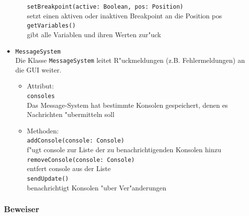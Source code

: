 \documentclass[10pt,a4paper,titlepage]{article}
\begin{document}
\begin{itemize}
\begin{itemize}
\texttt{setBreakpoint(active: Boolean, pos: Position)} \\
setzt einen aktiven oder inaktiven Breakpoint an die Position pos \\
\texttt{getVariables()} \\
gibt alle Variablen und ihren Werten zur"uck
\end{itemize}
\item \texttt{MessageSystem} \\
Die Klasse \texttt{MessageSystem} leitet R"uckmeldungen (z.B. Fehlermeldungen) an die GUI weiter. 
\begin{itemize}
\item Attribut: \\
\texttt{consoles} \\
Das Message-System hat bestimmte Konsolen gespeichert, denen es Nachrichten "ubermitteln soll 
\item Methoden: \\
\texttt{addConsole(console: Console)} \\
f"ugt console zur Liste der zu benachrichtigenden Konsolen hinzu \\
\texttt{removeConsole(console: Console)} \\
entfert console aus der Liste \\
\texttt{sendUpdate()} \\
benachrichtigt Konsolen "uber Ver"anderungen \\
\end{itemize}
\end{itemize}

\subsubsection{Beweiser}
\end{document}
